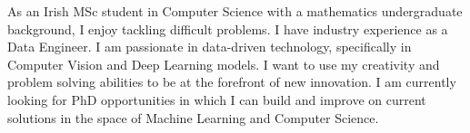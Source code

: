 

\begin{cvparagraph}

As an Irish MSc student in Computer Science with a mathematics undergraduate background, I enjoy tackling difficult problems. I have industry experience as a Data Engineer. I am passionate in data-driven technology, specifically in Computer Vision and Deep Learning models. I want to use my creativity and problem solving abilities to be at the forefront of new innovation. I am currently looking for PhD opportunities in which I can build and improve on current solutions in the space of Machine Learning and Computer Science.

\end{cvparagraph}